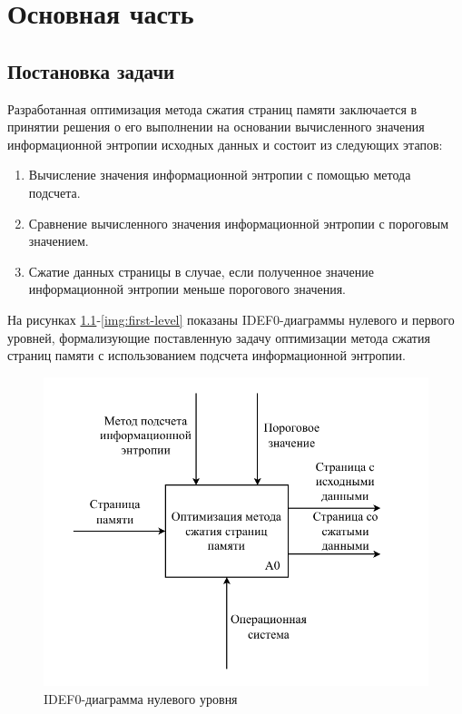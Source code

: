 \chapter{Основная часть}

\section{Постановка задачи}

Разработанная оптимизация метода сжатия страниц памяти заключается в принятии решения о его выполнении на основании вычисленного значения информационной энтропии исходных данных и состоит из следующих этапов:

\begin{enumerate}
	\item Вычисление значения информационной энтропии с помощью метода подсчета.
	\item Сравнение вычисленного значения информационной энтропии с пороговым значением.
	\item Сжатие данных страницы в случае, если полученное значение информационной энтропии меньше порогового значения.
\end{enumerate}

На рисунках \ref{img:zero-level}-\ref{img:first-level} показаны IDEF0-диаграммы нулевого и первого уровней, формализующие поставленную задачу оптимизации метода сжатия страниц памяти с использованием подсчета информационной энтропии.

\begin{figure}[H]
	\begin{center}
		\includegraphics[scale=0.8]{inc/img/zero-level.pdf}
	\end{center}
	\captionsetup{justification=centering}
	\caption{IDEF0-диаграмма нулевого уровня}
	\label{img:zero-level}
\end{figure}

